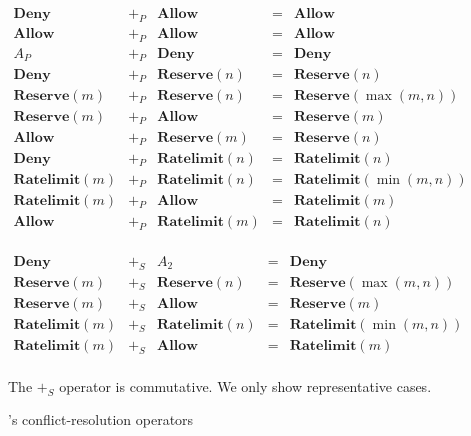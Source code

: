 \begin{figure}[t]
\begin{small}
\begin{displaymath}
\begin{array}{lclcl}
\textbf{Deny} & +_P & \textbf{Allow} & = & \textbf{Allow} \\
\textbf{Allow} & +_P & \textbf{Allow} & = & \textbf{Allow} \\
A_P & +_P & \textbf{Deny} & = & \textbf{Deny} \\
\textbf{Deny} & +_P & \textbf{Reserve}(n) & = & \textbf{Reserve}(n) \\
\textbf{Reserve}(m) & +_P & \textbf{Reserve}(n) & = & \textbf{Reserve}(\max(m,n)) \\
\textbf{Reserve}(m) & +_P & \textbf{Allow} & = & \textbf{Reserve}(m) \\
\textbf{Allow} & +_P & \textbf{Reserve}(m) & = & \textbf{Reserve}(n) \\
\textbf{Deny} & +_P & \textbf{Ratelimit}(n) & = & \textbf{Ratelimit}(n) \\
\textbf{Ratelimit}(m) & +_P & \textbf{Ratelimit}(n) & = & \textbf{Ratelimit}(\min(m,n)) \\
\textbf{Ratelimit}(m) & +_P & \textbf{Allow} & = & \textbf{Ratelimit}(m) \\
\textbf{Allow} & +_P & \textbf{Ratelimit}(m) & = & \textbf{Ratelimit}(n) \\
\end{array}
\end{displaymath}

\begin{displaymath}
\begin{array}{lclcl}
\textbf{Deny} & +_S & A_2 & = & \textbf{Deny} \\
\textbf{Reserve}(m) & +_S & \textbf{Reserve}(n) & = & \textbf{Reserve}(\max(m,n)) \\
\textbf{Reserve}(m) & +_S & \textbf{Allow} & = & \textbf{Reserve}(m) \\
\textbf{Ratelimit}(m) & +_S & \textbf{Ratelimit}(n) & = & \textbf{Ratelimit}(\min(m,n)) \\
\textbf{Ratelimit}(m) & +_S & \textbf{Allow} & = & \textbf{Ratelimit}(m) \\
\end{array}
\end{displaymath}
\end{small}
{\small The $+_S$ operator is commutative. We only show representative cases.}

\caption{\sys's conflict-resolution operators}
\label{f:sysconflicts}

\end{figure}

